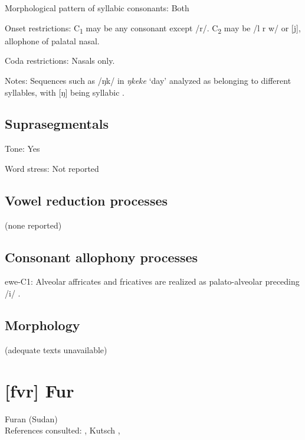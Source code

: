 {\begin{appendixdesc}
\item[Morphological pattern of syllabic consonants:] Both

\item[Onset restrictions:] C\textsubscript{1} may be any consonant except /r/. C\textsubscript{2} may be /l r w/ or [j], allophone of palatal nasal.

\item[Coda restrictions:] Nasals only.

\item[Notes:] Sequences such as /ŋk/ in \textit{ŋkeke} ‘day’ analyzed as belonging to different syllables, with [ŋ] being syllabic \citep[39]{Ameka1991}.
\end{appendixdesc}
\subsection*{Suprasegmentals}
\begin{appendixdesc}
\item[Tone:] Yes

\item[Word stress:] Not reported
\end{appendixdesc}
\subsection*{Vowel reduction processes}

(none reported)

\subsection*{Consonant allophony processes}
\begin{appendixdesc}

\item[ewe-C1:] Alveolar affricates and fricatives are realized as palato-alveolar preceding /i/ \citep[9]{Jalloh2005}.
\end{appendixdesc}
\subsection*{Morphology}

(adequate texts unavailable)
\section*{[fvr] Fur}  %
Furan (Sudan)\medskip\\
References consulted: \citet{Jakobi1990}, Kutsch \citet{LojengaWaag2004}, \citet{Noel2008}

}
